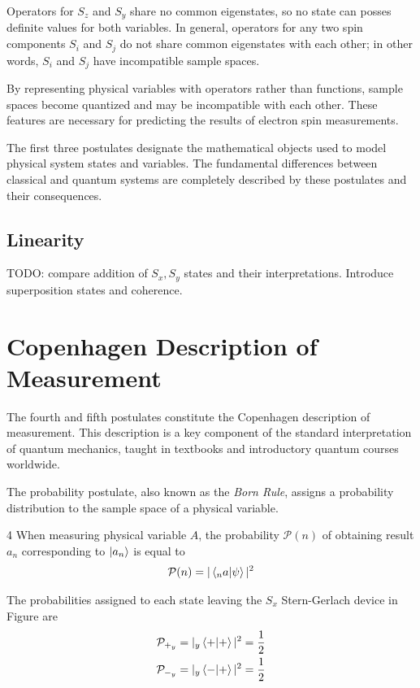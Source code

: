 Operators for $S_z$ and $S_y$ share no common eigenstates, so no state can posses definite values for both variables. In general, operators for any two spin components $S_i$ and $S_j$ do not share common eigenstates with each other; in other words, $S_i$ and $S_j$ have incompatible sample spaces.

By representing physical variables with operators rather than functions, sample spaces become quantized and may be incompatible with each other. These features are necessary for predicting the results of electron spin measurements.

The first three postulates designate the mathematical objects used to model physical system states and variables. The fundamental differences between classical and quantum systems are completely described by these postulates and their consequences.

\subsection{Linearity}
TODO: compare addition of $S_x, S_y$ states and their interpretations. Introduce superposition states and coherence.

\section{Copenhagen Description of Measurement}
The fourth and fifth postulates constitute the Copenhagen description of measurement. This description is a key component of the standard interpretation of quantum mechanics, taught in textbooks and introductory quantum courses worldwide.

The probability postulate, also known as the \textit{Born Rule}, assigns a probability distribution to the sample space of a physical variable.

\begin{Thm:Postulate}{4}
    When measuring physical variable $A$, the probability $\mathcal{P}(n)$ of obtaining result $a_n$ corresponding to $\ket{a_n}$  is equal to
     \begin{align}
        \mathcal{P}(n) = |\braket{_na|\psi}|^2
    \end{align}
\end{Thm:Postulate}

The probabilities assigned to each state leaving the $S_x$ Stern-Gerlach device in Figure  are
\begin{align}
    \mathcal{P}_{+_y} &= |_y\braket{+|+}|^2 = \frac{1}{2} \\
    \mathcal{P}_{-_y} &= |_y\braket{-|+}|^2 = \frac{1}{2}
\end{align}

